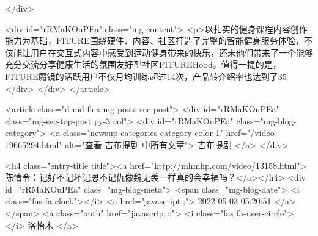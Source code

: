                                             </div>


                                            <div id="rRMaKOuPEa"  class="mg-content">
                                                <p>以扎实的健身课程内容创作能力为基础，FITURE围绕硬件、内容、社区打造了完整的智能健身服务体验，不仅能让用户在交互式内容中感受到运动健身带来的快乐，还未他们带来了一个能够充分交流分享健康生活的氛围友好型社区FITUREHood。值得一提的是，FITURE魔镜的活跃用户不仅月均训练超过14次，产品转介绍率也达到了35%
                                            </div>
                                        </div>
                                    </article>
                                    
                                    <article class="d-md-flex mg-posts-sec-post">
                                        <div id="rRMaKOuPEa"  class="mg-sec-top-post py-3 col">
                                            <div id="rRMaKOuPEa"  class="mg-blog-category">
                                                <a class="newsup-categories category-color-1" href="/video-19665294.html" alt="查看 吉布提剧 中所有文章">
                                                    吉布提剧
                                                </a>
                                            </div>

                                            <h4 class="entry-title title"><a href="http://mhmhp.com/video/13158.html">陈情令：记好不记坏记恩不记仇像魏无羡一样真的会幸福吗？</a></h4>
                                            <div id="rRMaKOuPEa"  class="mg-blog-meta">
                                                <span class="mg-blog-date">
                                                    <i class="fas fa-clock"></i>
                                                    <a href="javascript:;">
                                                        2022-05-03 05:20:51
                                                    </a>
                                                </span>
                                                <a class="auth" href="javascript:;">
                                                    <i class="fas fa-user-circle"></i>
                                                    洛怡木
                                                </a>

